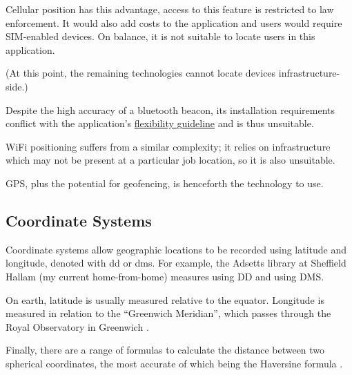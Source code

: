 Cellular position has this advantage, access to this
feature is restricted to law enforcement.
It would also add costs to the application and
\projectname{} users would require SIM-enabled devices.
On balance, it is not suitable to locate users in this
application.

(At this point, the remaining technologies cannot locate
devices infrastructure-side.)

Despite the high accuracy of a bluetooth beacon, its
installation requirements conflict with the application's
\hyperref[ss:goal]{flexibility guideline} and is thus
unsuitable.

WiFi positioning suffers from a similar complexity; it
relies on infrastructure which may not be present at a
particular job location, so it is also unsuitable.

GPS, plus the potential for geofencing, is henceforth the
technology to use.

\subsection{Coordinate Systems}
\label{ss:coordSystems}

Coordinate systems allow geographic locations to be
recorded using \gls{latitude} and \gls{longitude}, denoted
with \gls{dd} or \gls{dms}.
For example, the Adsetts library at Sheffield Hallam (my
current home-from-home) measures
 using DD and
 using DMS.

On earth, latitude is usually measured relative to the
equator.
Longitude is measured in relation to the \enquote{Greenwich
  Meridian}, which passes through the Royal Observatory in
Greenwich \parencite{coordSystems}.

Finally, there are a range of formulas to calculate the
distance between two spherical coordinates, the most
accurate of which being the Haversine formula
\parencite{haversine}.